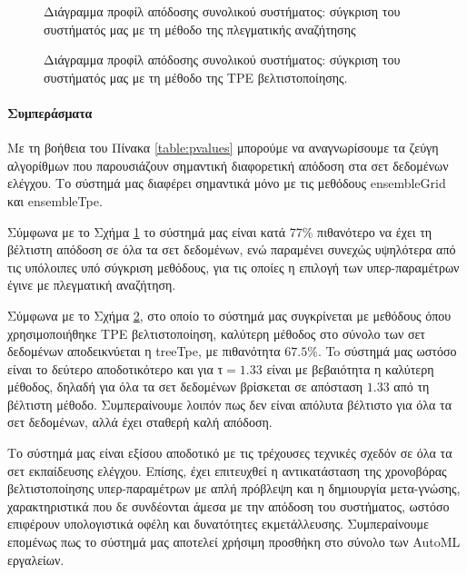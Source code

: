 \begin{figure}[!htb]
	\scalebox{0.8}{
	}
	\caption{Διάγραμμα προφίλ απόδοσης συνολικού συστήματος: σύγκριση του συστήματός μας με τη μέθοδο της πλεγματικής αναζήτησης}
	\label{fig:systemprofgrid}
\end{figure}


\begin{figure}[!htb]
	\scalebox{0.8}{
	}
	\caption{Διάγραμμα προφίλ απόδοσης συνολικού συστήματος: σύγκριση του συστήματός μας με τη μέθοδο της ΤPE βελτιστοποίησης.}
	\label{fig:systemproftpe}
\end{figure}
	
\paragraph{Συμπεράσματα}
Με τη βοήθεια του Πίνακα \ref{table:pvalues} μπορούμε να αναγνωρίσουμε τα ζεύγη αλγορίθμων που παρουσιάζουν σημαντική διαφορετική απόδοση στα σετ δεδομένων ελέγχου. Το σύστημά μας διαφέρει σημαντικά μόνο με τις μεθόδους ensembleGrid και ensembleTpe.

Σύμφωνα με το Σχήμα \ref{fig:systemprofgrid} το σύστημά μας είναι κατά $77\%$ πιθανότερο να έχει τη βέλτιστη απόδοση σε όλα τα σετ δεδομένων, ενώ παραμένει συνεχώς υψηλότερα από τις υπόλοιπες υπό σύγκριση μεθόδους, για τις οποίες η επιλογή των υπερ-παραμέτρων έγινε με πλεγματική αναζήτηση.


Σύμφωνα με το Σχήμα \ref{fig:systemproftpe}, στο οποίο το σύστημά μας συγκρίνεται με μεθόδους όπου χρησιμοποιήθηκε TPE βελτιστοποίηση, καλύτερη μέθοδος στο σύνολο των σετ δεδομένων αποδεικνύεται η treeTpe, με πιθανότητα $67.5 \%$. To σύστημά μας ωστόσο είναι το δεύτερο αποδοτικότερο και για τ$=1.33$ είναι με βεβαιότητα η καλύτερη μέθοδος, δηλαδή για όλα τα σετ δεδομένων βρίσκεται σε απόσταση $1.33$ από τη βέλτιστη μέθοδο. Συμπεραίνουμε λοιπόν πως δεν είναι απόλυτα βέλτιστο για όλα τα σετ δεδομένων, αλλά έχει σταθερή καλή απόδοση. 

Το σύστημά μας είναι εξίσου αποδοτικό με τις τρέχουσες τεχνικές σχεδόν σε όλα τα σετ εκπαίδευσης ελέγχου. Επίσης, έχει επιτευχθεί η αντικατάσταση της χρονοβόρας βελτιστοποίησης υπερ-παραμέτρων με απλή πρόβλεψη και η δημιουργία μετα-γνώσης, χαρακτηριστικά που δε συνδέονται άμεσα με την απόδοση του συστήματος, ωστόσο επιφέρουν υπολογιστικά οφέλη και δυνατότητες εκμετάλλευσης. Συμπεραίνουμε επομένως πως το σύστημά μας αποτελεί χρήσιμη προσθήκη στο σύνολο των \gls{AutoML} εργαλείων. 